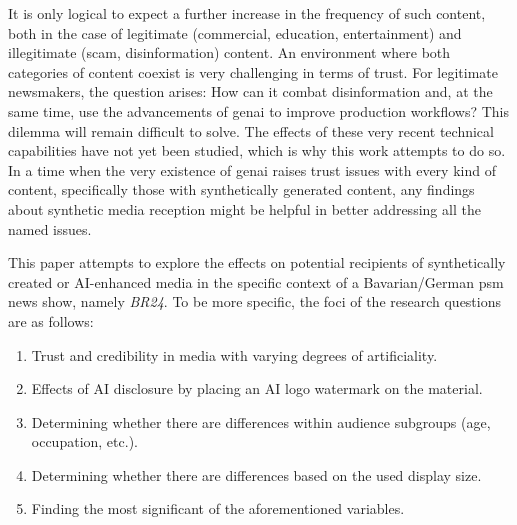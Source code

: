 \documentclass[
  a4paper,  %
  twoside,  %
  bibliography=totoc,
  headsepline,
  cleardoublepage=empty,
  parskip=half,
  draft=false
]{scrbook}
\begin{document}
It is only logical to expect a further increase in the frequency of such content, both in the case of legitimate (commercial, education, entertainment) and illegitimate (scam, disinformation) content. An environment where both categories of content coexist is very challenging in terms of trust. For legitimate newsmakers, the question arises: How can it combat disinformation and, at the same time, use the advancements of \gls{genai} to improve production workflows? This dilemma will remain difficult to solve. The effects of these very recent technical capabilities have not yet been studied, which is why this work attempts to do so. In a time when the very existence of \gls{genai} raises trust issues with every kind of content, specifically those with synthetically generated content, any findings about synthetic media reception might be helpful in better addressing all the named issues.

This paper attempts to explore the effects on potential recipients of synthetically created or AI-enhanced media in the specific context of a Bavarian/German \gls{psm} news show, namely \textit{BR24}. To be more specific, the foci of the research questions are as follows: 

\begin{enumerate}
  \item Trust and credibility in media with varying degrees of artificiality.
  \item Effects of AI disclosure by placing an AI logo watermark on the material.
  \item Determining whether there are differences within audience subgroups (age, occupation, etc.).
  \item Determining whether there are differences based on the used display size.
  \item Finding the most significant of the aforementioned variables.
\end{enumerate}
\end{document}
